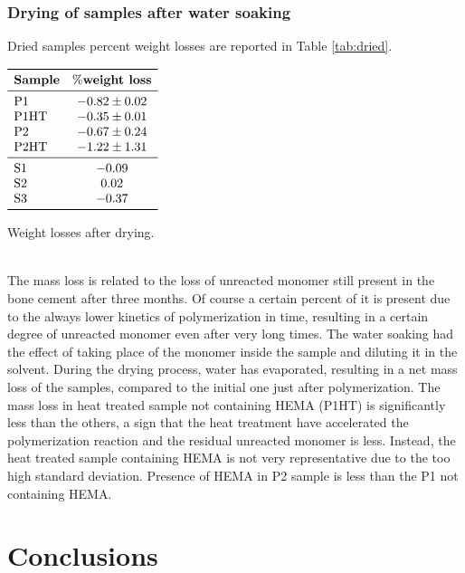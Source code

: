 \documentclass[a4paper, 11pt]{article}
\begin{document}
\subsubsection{Drying of samples after water soaking}

Dried samples percent weight losses are reported in Table \ref{tab:dried}. 
\begin{table}[htp]
\centering
$
\begin{array}{lc}
\toprule
\textbf{Sample} & \textbf{$\%$weight loss}  \\
\midrule
\text{P1} & -0.82 \pm0.02 \\
\text{P1HT} & -0.35\pm0.01 \\
\text{P2} & -0.67\pm0.24 \\
\text{P2HT} & -1.22\pm1.31 \\
\midrule
\text{S1} & -0.09 \\
\text{S2} & 0.02 \\
\text{S3} & -0.37 \\
\bottomrule
\end{array}
$
\caption{Weight losses after drying.}
\label{tab:dried}
\end{table}\\
The mass loss is related to the loss of unreacted monomer still present in the bone cement after three months. Of course a certain percent of it is present due to the always lower kinetics of polymerization in time, resulting in a certain degree of unreacted monomer even after very long times. The water soaking had the effect of taking place of the monomer inside the sample and diluting it in the solvent. During the drying process, water has evaporated, resulting in a net mass loss of the samples, compared to the initial one just after polymerization. 
The mass loss in heat treated sample not containing HEMA (P1HT) is significantly less than the others, a sign that the heat treatment have accelerated the polymerization reaction and the residual unreacted monomer is less. Instead, the heat treated sample containing HEMA is not very representative due to the too high standard deviation. Presence of HEMA in P2 sample is less than the P1 not containing HEMA. 

\newpage

\section{Conclusions}
\end{document}
